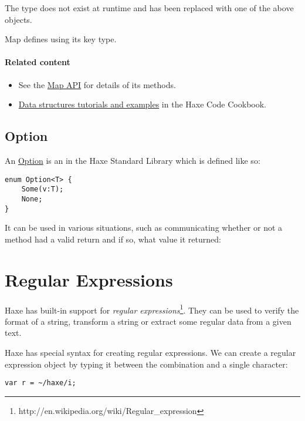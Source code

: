 The  type does not exist at runtime and has been replaced with one of the above objects. 

Map defines  using its key type.


\paragraph{Related content}
\begin{itemize}
	\item See the \href{https://api.haxe.org/Map.html}{Map API} for details of its methods.
	\item \href{http://code.haxe.org/category/data-structures/}{Data structures tutorials and examples} in the Haxe Code Cookbook.
\end{itemize}

\subsection{Option}
\label{std-Option}

An \href{https://api.haxe.org/haxe/ds/Option.html}{Option} is an  in the Haxe Standard Library which is defined like so:

\begin{lstlisting}
enum Option<T> {
	Some(v:T);
	None;
}
\end{lstlisting}

It can be used in various situations, such as communicating whether or not a method had a valid return and if so, what value it returned:



\section{Regular Expressions}
\label{std-regex}

Haxe has built-in support for \emph{regular expressions}\footnote{http://en.wikipedia.org/wiki/Regular_expression}. They can be used to verify the format of a string, transform a string or extract some regular data from a given text.

Haxe has special syntax for creating regular expressions. We can create a regular expression object by typing it between the \expr{\textasciitilde/} combination and a single \expr{/} character:

\begin{lstlisting}
var r = ~/haxe/i;
\end{lstlisting}

